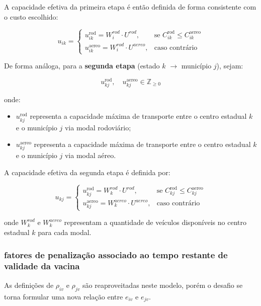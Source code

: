 A capacidade efetiva da primeira etapa é então definida de forma consistente com o custo escolhido:

\begin{equation}
u_{ik} =
\begin{cases}
u_{ik}^{\text{rod}} = W_i^{rod} \cdot U^{rod}, & \text{se } C_{ik}^{\text{rod}} \le C_{ik}^{\text{aereo}} \\
u_{ik}^{\text{aereo}} = W_i^{rod} \cdot U^{aereo}, & \text{caso contrário}
\end{cases}
\end{equation}

De forma análoga, para a \textbf{segunda etapa} (estado $k$ $\rightarrow$ município $j$), sejam:

\[
u_{kj}^{\text{rod}}, \quad u_{kj}^{\text{aereo}} \in \mathbb{Z}_{\ge 0}
\]

onde:
\begin{itemize}
    \item $u_{kj}^{\text{rod}}$ representa a capacidade máxima de transporte entre o centro estadual $k$ e o município $j$ via modal rodoviário;
    \item $u_{kj}^{\text{aereo}}$ representa a capacidade máxima de transporte entre o centro estadual $k$ e o município $j$ via modal aéreo.
\end{itemize}

A capacidade efetiva da segunda etapa é definida por:

\begin{equation}
u_{kj} =
\begin{cases}
u_{kj}^{\text{rod}} = W_k^{rod} \cdot U^{rod}, & \text{se } C_{kj}^{\text{rod}} \le C_{kj}^{\text{aereo}} \\
u_{kj}^{\text{aereo}} = W_k^{aereo} \cdot U^{aereo}, & \text{caso contrário}
\end{cases}
\end{equation}

onde $W_k^{rod}$ e $W_k^{aereo}$ representam a quantidade de veículos disponíveis no centro estadual $k$ para cada modal.

\subsubsection{fatores de penalização associado ao tempo restante de validade da vacina}

As definições de $\rho_{iv}$ e $\rho_{jv}$ são reaproveitadas neste modelo, porém o desafio se torna formular uma nova relação entre $e_{iv}$ e $e_{jv}$.

